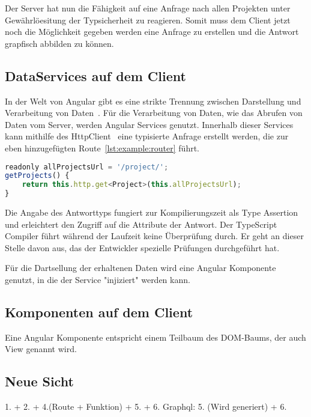 Der Server hat nun die Fähigkeit auf eine Anfrage nach allen Projekten unter Gewährlöesitung der Typsicherheit zu reagieren.
Somit muss dem Client jetzt noch die Möglichkeit gegeben werden eine Anfrage zu erstellen und die Antwort grapfisch abbilden zu können.

\subsection{DataServices auf dem Client}
\label{sec:requirements:dataservice}
In der Welt von Angular gibt es eine strikte Trennung zwischen Darstellung und Verarbeitung von Daten~\cite{angular-service}.
Für die Verarbeitung von Daten, wie das Abrufen von Daten vom Server, werden Angular Services genutzt.
Innerhalb dieser Services kann mithilfe des HttpClient~\cite{angular-http} eine typisierte Anfrage erstellt werden, die zur eben
hinzugefügten Route~\ref{lst:example:router} führt.

\begin{lstlisting}[language=JavaScript,float=h!,caption={Funktion zum Abruf aller Projekte vom Server}, label={lst:example:service}]
readonly allProjectsUrl = '/project/';
getProjects() {
    return this.http.get<Project>(this.allProjectsUrl);
}
\end{lstlisting}

Die Angabe des Antworttyps fungiert zur Kompilierungszeit als Type Assertion~\cite{typescript-typeassertion}
und erleichtert den Zugriff auf die Attribute der Antwort. Der TypeScript Compiler führt während der Laufzeit keine Überprüfung durch.
Er geht an dieser Stelle davon aus, das der Entwickler spezielle Prüfungen durchgeführt hat.

Für die Dartsellung der erhaltenen Daten wird eine Angular Komponente genutzt, in die der Service "injiziert" werden kann.

\subsection{Komponenten auf dem Client}
\label{sec:requirements:component}
Eine Angular Komponente entspricht einem Teilbaum des DOM-Baums, der auch View genannt wird.

\subsection{Neue Sicht}
1. + 2. + 4.(Route + Funktion) + 5. + 6.
Graphql: 5. (Wird generiert) + 6.

